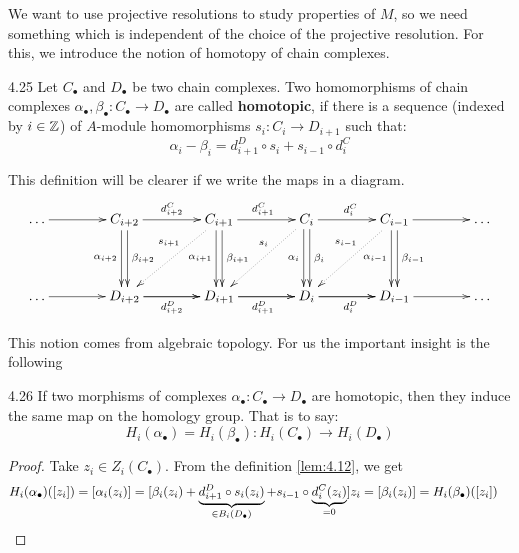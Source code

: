 \documentclass[twoside = false,	%
		headsepline,		%
		parskip = true,
		]{scrbook}						%
\begin{document}
    We want to use projective resolutions to study properties of $M$, so we need something which is independent of the choice of the projective resolution. For this, we introduce the notion of homotopy of chain complexes.

    \begin{definition}{}{4.25}
        Let $C_\bullet$ and $D_\bullet$ be two chain complexes. Two homomorphisms of chain complexes $\alpha_\bullet,\beta_\bullet: C_\bullet \to D_\bullet$ are called \textbf{homotopic}, if there is a sequence (indexed by $i \in \mathbb Z$) of $A$-module homomorphisms $s_i:C_i \to D_{i+1}$ such that:
        \begin{equation*}
            \alpha_i - \beta_i = d_{i+1}^D \circ s_i + s_{i-1} \circ d_i^C
        \end{equation*}
    \end{definition}

    This definition will be clearer if we write the maps in a diagram.
    \begin{equation*}
    \xymatrix@C=40pt @R=40pt{
        \dots \ar[r] & C_{i+2} \ar[r]^{d_{i+2}^C} \ar@<-0.5ex>[d]_{\alpha_{i+2}} \ar@<0.5ex>[d]^{\beta_{i+2}} & C_{i+1} \ar[r]^{d_{i+1}^C} \ar@<-0.5ex>[d]_{\alpha_{i+1}} \ar@<0.5ex>[d]^{\beta_{i+1}} \ar@{.>}[dl]_(.4){s_{i+1}} & C_i \ar[r]^{d_i^C} \ar@<-0.5ex>[d]_{\alpha_{i}} \ar@<0.5ex>[d]^{\beta_{i}} \ar@{.>}[dl]_(.4){s_{i}} & C_{i-1} \ar[r] \ar@<-0.5ex>[d]_{\alpha_{i-1}} \ar@<0.5ex>[d]^{\beta_{i-1}} \ar@{.>}[dl]_(.4){s_{i-1}} & \dots \\
        \dots \ar[r] & D_{i+2} \ar[r]\ar[r]_{d_{i+2}^D} & D_{i+1} \ar[r]\ar[r]_{d_{i+1}^D} & D_i \ar[r]\ar[r]_{d_{i}^D} & D_{i-1} \ar[r] & \dots
    }
    \end{equation*}

    This notion comes from algebraic topology. For us the important insight is the following

    \begin{lemma}{}{4.26}
        If two morphisms of complexes $\alpha_\bullet: C_\bullet \to D_\bullet$ are homotopic, then they induce the same map on the homology group. That is to say:
        \begin{equation*}
            H_i(\alpha_\bullet) = H_i(\beta_\bullet): H_i(C_\bullet) \to H_i(D_\bullet)
        \end{equation*}
    \end{lemma}

    \begin{proof}
        Take $z_i \in Z_i(C_\bullet)$. From the definition \ref{lem:4.12}, we get
        \begin{equation*}
        \begin{split}
            H_i(\alpha_\bullet)([z_i]) &= \left[ \alpha_i(z_i)\right] = [\beta_i(z_i) + \underbrace{d_{i+1}^D \circ s_i(z_i)}_{\in B_i(D_\bullet)} + s_{i-1} \circ \underbrace{d_i^C(z_i)}_{=0}]z_i = [\beta_i(z_i)] = H_i(\beta_\bullet)([z_i])
        \end{split}
        \end{equation*}
    \end{proof}
\end{document}
